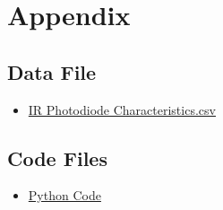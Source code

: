 \documentclass[12pt]{article}
\begin{document}
\section{Appendix}
\subsection*{Data File}
\begin{itemize}
  \item \href{https://drive.google.com/drive/folders/1A5ta1QYY_Sygo3tfl44TySLrXgKUCzGN?usp=drive_link} {IR Photodiode Characteristics.csv}
\end{itemize}
\subsection*{Code Files}
\begin{itemize}
  \item \href{https://drive.google.com/drive/folders/1DQeljcbbAsHtRlvSBTwIV61tD_d72g0o?usp=drive_link}{Python Code}
\end{itemize}
\end{document}
